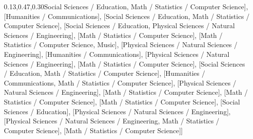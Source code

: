 \documentclass[
  letterpaper,
  DIV=11,
  numbers=noendperiod]{scrreprt}
\newenvironment{Shaded}{\begin{snugshade}}{\end{snugshade}}
\newcommand{\NormalTok}[1]{\textcolor[rgb]{0.00,0.23,0.31}{#1}}
\newcommand{\StringTok}[1]{\textcolor[rgb]{0.13,0.47,0.30}{#1}}
\begin{document}
\begin{Shaded}
\begin{Highlighting}[]
[}\StringTok{\textquotesingle{}Social Sciences / Education\textquotesingle{}}\NormalTok{, }\StringTok{\textquotesingle{}Math / Statistics / Computer Science\textquotesingle{}}\NormalTok{], [}\StringTok{\textquotesingle{}Humanities / Communications\textquotesingle{}}\NormalTok{], [}\StringTok{\textquotesingle{}Social Sciences / Education\textquotesingle{}}\NormalTok{, }\StringTok{\textquotesingle{}Math / Statistics / Computer Science\textquotesingle{}}\NormalTok{], [}\StringTok{\textquotesingle{}Social Sciences / Education\textquotesingle{}}\NormalTok{,  }\StringTok{\textquotesingle{}Physical Sciences / Natural Sciences / Engineering\textquotesingle{}}\NormalTok{], [}\StringTok{\textquotesingle{}Math / Statistics / Computer Science\textquotesingle{}}\NormalTok{], [}\StringTok{\textquotesingle{}Math / Statistics / Computer Science\textquotesingle{}}\NormalTok{, }\StringTok{\textquotesingle{}Music\textquotesingle{}}\NormalTok{], [}\StringTok{\textquotesingle{}Physical Sciences / Natural Sciences / Engineering\textquotesingle{}}\NormalTok{], [}\StringTok{\textquotesingle{}Humanities / Communications\textquotesingle{}}\NormalTok{], [}\StringTok{\textquotesingle{}Physical Sciences / Natural Sciences / Engineering\textquotesingle{}}\NormalTok{], [}\StringTok{\textquotesingle{}Math / Statistics / Computer Science\textquotesingle{}}\NormalTok{], [}\StringTok{\textquotesingle{}Social Sciences / Education\textquotesingle{}}\NormalTok{, }\StringTok{\textquotesingle{}Math / Statistics / Computer Science\textquotesingle{}}\NormalTok{], [}\StringTok{\textquotesingle{}Humanities / Communications\textquotesingle{}}\NormalTok{, }\StringTok{\textquotesingle{}Math / Statistics / Computer Science\textquotesingle{}}\NormalTok{], [}\StringTok{\textquotesingle{}Physical Sciences / Natural Sciences / Engineering\textquotesingle{}}\NormalTok{], [}\StringTok{\textquotesingle{}Math / Statistics / Computer Science\textquotesingle{}}\NormalTok{], [}\StringTok{\textquotesingle{}Math / Statistics / Computer Science\textquotesingle{}}\NormalTok{], [}\StringTok{\textquotesingle{}Math / Statistics / Computer Science\textquotesingle{}}\NormalTok{], [}\StringTok{\textquotesingle{}Social Sciences / Education\textquotesingle{}}\NormalTok{], [}\StringTok{\textquotesingle{}Physical Sciences / Natural Sciences / Engineering\textquotesingle{}}\NormalTok{], [}\StringTok{\textquotesingle{}Physical Sciences / Natural Sciences / Engineering\textquotesingle{}}\NormalTok{,  }\StringTok{\textquotesingle{}Math / Statistics / Computer Science\textquotesingle{}}\NormalTok{], [}\StringTok{\textquotesingle{}Math / Statistics / Computer Science\textquotesingle{}}\NormalTok{]]}
\end{Highlighting}
\end{Shaded}
\end{document}
